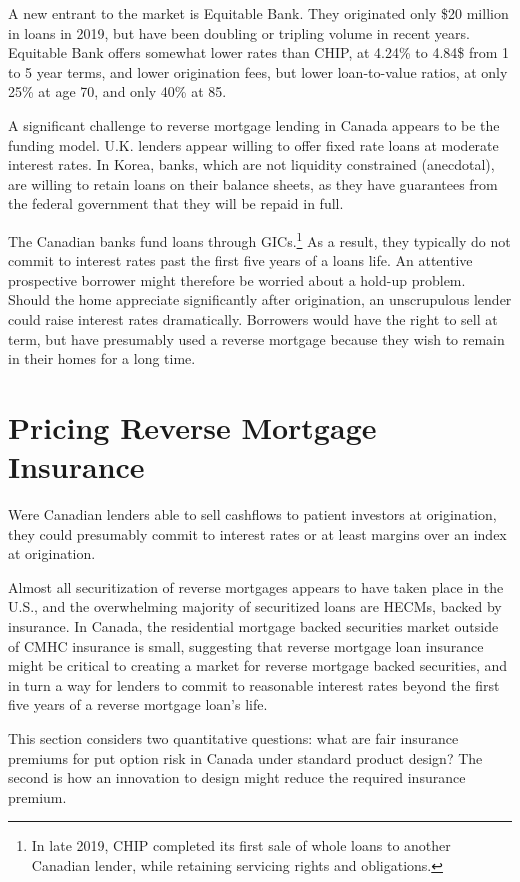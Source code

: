 \documentclass[12pt]{article}
\begin{document}
A new entrant to the market is Equitable Bank. They originated only \$20
million in loans in 2019, but have been doubling or tripling volume in recent
years. Equitable Bank offers somewhat lower rates than CHIP, at 4.24\% to
4.84\$ from 1 to 5 year terms, and lower origination fees, but lower
loan-to-value ratios, at only 25\% at age 70, and only 40\% at 85.

A significant challenge to reverse mortgage lending in Canada appears to be the
funding model. U.K. lenders appear willing to offer fixed rate loans at
moderate interest rates. In Korea, banks, which are not liquidity constrained
(anecdotal), are willing to retain loans on their balance sheets, as they have
guarantees from the federal government that they will be repaid in full. 

The Canadian banks fund loans through GICs.\footnote{In late 2019, CHIP
completed its first sale of whole loans to another Canadian lender, while
retaining servicing rights and obligations.} As a result, they typically do not
commit to interest rates past the first five years of a loans life. An
attentive prospective borrower might therefore be worried about a hold-up
problem. Should the home appreciate significantly after origination, an
unscrupulous lender could raise interest rates dramatically. Borrowers would
have the right to sell at term, but have presumably used a reverse mortgage
because they wish to remain in their homes for a long time.

\section{\label{sec:model} Pricing Reverse Mortgage Insurance }

Were Canadian lenders able to sell cashflows to patient investors at
origination, they could presumably commit to interest rates or at least margins
over an index at origination. 

Almost all securitization of reverse mortgages appears to have taken place in
the U.S., and the overwhelming majority of securitized loans are HECMs, backed
by insurance. In Canada, the residential mortgage backed securities market
outside of CMHC insurance is small, suggesting that reverse mortgage loan
insurance might be critical to creating a market for reverse mortgage backed
securities, and in turn a way for lenders to commit to reasonable interest
rates beyond the first five years of a reverse mortgage loan's life.

This section considers two quantitative questions: what are fair insurance premiums for put
option risk in Canada under standard product design? The second is how an
innovation to design might reduce the required insurance premium.
\end{document}
